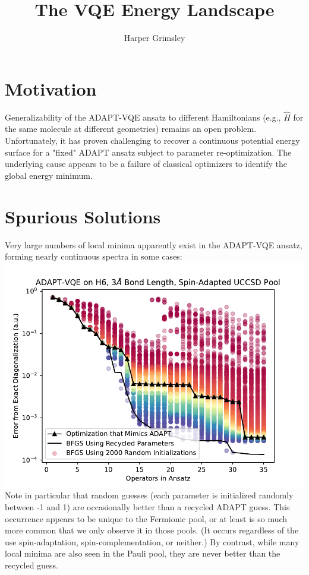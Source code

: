 \documentclass{article}
\begin{document}
\title{The VQE Energy Landscape}
\author{Harper Grimsley}
\maketitle
\section{Motivation}
Generalizability of the ADAPT-VQE ansatz to different Hamiltonians (e.g., $\hat{H}$ for the same molecule at different geometries) remains an open problem.  Unfortunately, it has proven challenging to recover a continuous potential energy surface for a "fixed" ADAPT ansatz subject to parameter re-optimization.  The underlying cause appears to be a failure of classical optimizers to identify the global energy minimum.
\section{Spurious Solutions}
Very large numbers of local minima apparently exist in the ADAPT-VQE ansatz, forming nearly continuous spectra in some cases:\\
\includegraphics{big.pdf}\\
Note in particular that random guesses (each parameter is initialized randomly between -1 and 1) are occasionally better than a recycled ADAPT guess.  This occurrence appears to be unique to the Fermionic pool, or at least is so much more common that we only observe it in those pools.  (It occurs regardless of the use spin-adaptation, spin-complementation, or neither.)  By contrast, while many local minima are also seen in the Pauli pool, they are never better than the recycled guess.  
\end{document}
